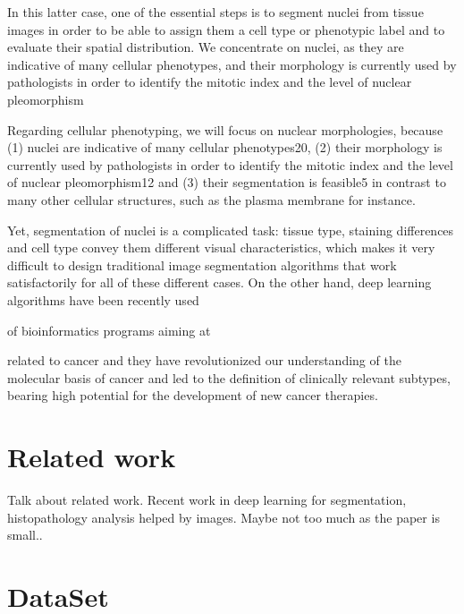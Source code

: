 \documentclass{article}
\begin{document}
In this latter case, one of the essential steps is to
segment nuclei from tissue images in order to be able to
assign them a cell type or phenotypic label and to evaluate their
spatial distribution. We concentrate on nuclei, as they are indicative
of many cellular phenotypes\citep{Chow2012}, and their morphology is 
currently used by pathologists in order to
identify the mitotic index and the level of nuclear pleomorphism

Regarding cellular phenotyping, we will focus on nuclear morphologies,
because (1) nuclei are indicative of many cellular phenotypes20, (2)
their morphology is currently used by pathologists in order to
identify the mitotic index and the level of nuclear pleomorphism12 and
(3) their segmentation is feasible5 in contrast to many other cellular
structures, such as the plasma membrane for instance.  



Yet, segmentation of nuclei is a
complicated task: tissue type, staining differences and cell type
convey them different visual characteristics, which makes it very difficult to
design traditional image segmentation algorithms that work
satisfactorily for all of these different cases. On the other hand,
deep learning algorithms have been recently used 





of bioinformatics programs aiming at 

related to cancer and they
have revolutionized our understanding of the molecular basis of cancer
and led to the definition of clinically relevant subtypes, bearing
high potential for the development of new cancer therapies.  



\section{Related work}
\label{sec:related}

Talk about related work.
Recent work in deep learning for segmentation, histopathology analysis helped by images. Maybe not too much as the paper is small..
\section{DataSet}
\label{sec:dataset}
\end{document}
